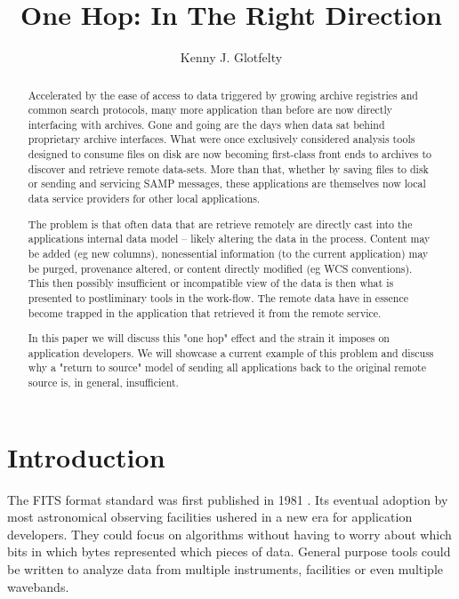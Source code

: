\documentclass[11pt,twoside]{article}
\begin{document}
\title{One Hop: In The Right Direction} \author{Kenny J. Glotfelty}

\begin{abstract}

Accelerated by the ease of access to data triggered by growing archive
registries and common search protocols, many more application than
before are now directly interfacing with archives.  Gone and going are
the days when data sat behind proprietary archive interfaces.  What were
once exclusively considered analysis tools designed to consume files
on disk are now becoming first-class front ends to archives to discover
and retrieve remote data-sets.  More than that, whether by saving files
to disk or sending and servicing SAMP messages, these applications are
themselves now local data service providers for other local applications.

The problem is that often data that are retrieve remotely are directly
cast into the applications internal data model -- likely altering
the data in the process.  Content may be added (eg new columns),
nonessential information (to the current application) may be purged,
provenance altered, or content directly modified (eg WCS conventions).
This then possibly insufficient or incompatible view of the  data is then
what is presented to postliminary tools in the work-flow. The remote
data have in essence become trapped in the application that retrieved
it from the remote service.

In this paper we will discuss this "one hop" effect and the strain
it imposes on application developers.  We will showcase a current
example of this problem and discuss why a "return to source" model
of sending all applications back to the original remote source is,
in general, insufficient.


\end{abstract}



\section{Introduction}


The FITS format standard was first published in 
1981 \citep{1981A&AS...44..363W}.  Its eventual
adoption by most astronomical observing facilities ushered in a new era for
application developers.  They could focus on algorithms without having to
worry about which bits in which bytes represented which pieces of data.
General purpose tools could be written to analyze data from multiple
instruments, facilities or even multiple wavebands.
\end{document}
